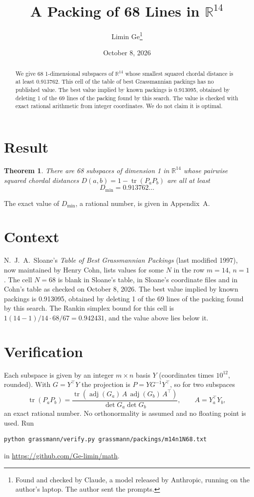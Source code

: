 \documentclass[11pt,a4paper]{article}
\title{A Packing of 68 Lines in $\mathbb{R}^{14}$}
\author{Limin Ge\thanks{Found and checked by Claude, a model released by Anthropic, running on the author's laptop. The author sent the prompts.}}
\date{October 8, 2026}
\newtheorem*{theorem}{Theorem}
\begin{document}
\maketitle
\begin{abstract}
We give 68 1-dimensional subspaces of $\mathbb{R}^{14}$ whose smallest squared chordal distance is at least 0.913762. This cell of the table of best Grassmannian packings has no published value. The best value implied by known packings is 0.913095, obtained by deleting 1 of the 69 lines of the packing found by this search. The value is checked with exact rational arithmetic from integer coordinates. We do not claim it is optimal.
\end{abstract}

\section{Result}
\begin{theorem}
There are 68 subspaces of dimension 1 in $\mathbb{R}^{14}$ whose pairwise squared chordal distances $D(a,b) = 1 - \operatorname{tr}(P_aP_b)$ are all at least
\[ D_{\min} = 0.913762\ldots \]
\end{theorem}
The exact value of $D_{\min}$, a rational number, is given in Appendix~A.


\section{Context}
N.~J.~A.~Sloane's \emph{Table of Best Grassmannian Packings} (last modified 1997), now maintained by Henry Cohn, lists values for some $N$ in the row $m=14$, $n=1$. The cell $N=68$ is blank in Sloane's table, in Sloane's coordinate files and in Cohn's table as checked on October 8, 2026. The best value implied by known packings is 0.913095, obtained by deleting 1 of the 69 lines of the packing found by this search. The Rankin simplex bound for this cell is $1(14-1)/14\cdot 68/67 = 0.942431$, and the value above lies below it.


\section{Verification}
Each subspace is given by an integer $m\times n$ basis $Y$ (coordinates times $10^{12}$, rounded). With $G=Y^\top Y$ the projection is $P=YG^{-1}Y^\top$, so for two subspaces
\[ \operatorname{tr}(P_aP_b)=\frac{\operatorname{tr}(\operatorname{adj}(G_a)\,A\,\operatorname{adj}(G_b)\,A^\top)}{\det G_a\det G_b},\qquad A=Y_a^\top Y_b, \]
an exact rational number. No orthonormality is assumed and no floating point is used. Run
\begin{verbatim}
python grassmann/verify.py grassmann/packings/m14n1N68.txt
\end{verbatim}
in \url{https://github.com/Ge-limin/math}.
\end{document}
